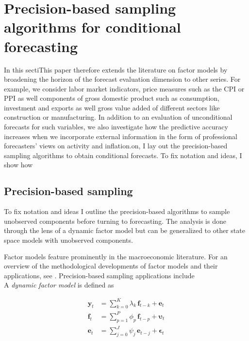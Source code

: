 \documentclass[notitlepage,a4paper,12pt]{article}
\begin{document}
\section{Precision-based sampling algorithms for conditional forecasting}\label{sec:precsampler}

In this sectiThis paper therefore extends the literature on factor models by broadening the horizon of the forecast evaluation dimension to other series. For example, we consider labor market indicators, price measures such as the CPI or PPI as well components of gross domestic product such as consumption, investment and exports as well gross value added of different sectors like construction or manufacturing. In addition to an evaluation of unconditional forecasts for such variables, we also investigate how the predictive accuracy increases when we incorporate external information in the form of professional forecasters' views on activity and inflation.on, I lay out the precision-based sampling algorithms to obtain conditional forecasts. To fix notation and ideas, I show how 
\subsection{Precision-based sampling}\label{subsec:precsampler}

To fix notation and ideas I outline the precision-based algorithms to sample unobserved components before turning to forecasting. The analysis is done through the lens of a dynamic factor model but can be generalized to other state space models with unobserved components.

Factor models feature prominently in the macroeconomic literature. For an overview of the methodological developments of factor models and their applications, see \citet{stockwatson2016_hbmacro}. Precision-based sampling applications include \citet{chanjeliazkov_2009,mccausland_factor2015,kaufmannschumacher_jae2017,kaufmannschumacher_jectrcs2019}\\

A \textit{dynamic factor model} is defined as

\begin{subequations}
    \label{eqn:factormodel}
    \begin{align}
        \mathbf{y}_t &= \sum_{k=0}^K \lambda_k \, \mathbf{f}_{t-k} + \mathbf{e}_t \label{eqn:facmod_obs}\\ 
        \mathbf{f}_t &= \sum_{p=1}^P \phi_p \, \mathbf{f}_{t-p} + \boldsymbol{\upsilon}_t \label{eqn:facmod_factors}\\
        \mathbf{e}_t &= \sum_{j=0}^J \psi_j \, \mathbf{e}_{t-j} + \boldsymbol{\epsilon}_t \label{eqn:facmod_idios}
    \end{align}
\end{subequations}
\end{document}
